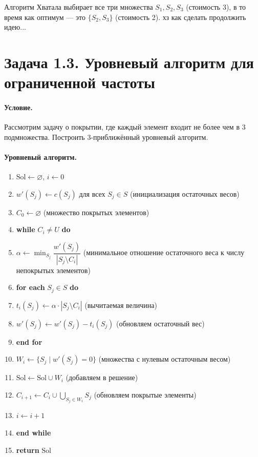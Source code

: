 \documentclass[12pt]{article}
\begin{document}
  Алгоритм Хватала выбирает все три множества \(S_1, S_2, S_3\) (стоимость 3), в то время как оптимум — это \(\{S_2, S_3\}\) (стоимость 2). хз как сделать продолжить идею...
  \section*{Задача 1.3. Уровневый алгоритм для ограниченной частоты}

  \paragraph{Условие.}
  Рассмотрим задачу о покрытии, где каждый элемент входит не более чем в 3 подмножества. Построить 3-приближённый уровневый алгоритм.

  \paragraph{Уровневый алгоритм.}
  \begin{enumerate}
    \item \(\text{Sol} \gets \varnothing\), \(i \gets 0\)
    \item \(w'(S_j) \gets c(S_j)\) для всех \(S_j \in S\) (инициализация остаточных весов)
    \item \(C_0 \gets \varnothing\) (множество покрытых элементов)
    \item \textbf{while} \(C_i \neq U\) \textbf{do}
    \item \quad \(\alpha \gets \min_{S_j} \dfrac{w'(S_j)}{|S_j \setminus C_i|}\) (минимальное отношение остаточного веса к числу непокрытых элементов)
    \item \quad \textbf{for each} \(S_j \in S\) \textbf{do}
    \item \quad\quad \(t_i(S_j) \gets \alpha \cdot |S_j \setminus C_i|\) (вычитаемая величина)
    \item \quad\quad \(w'(S_j) \gets w'(S_j) - t_i(S_j)\) (обновляем остаточный вес)
    \item \quad \textbf{end for}
    \item \quad \(W_i \gets \{S_j \mid w'(S_j) = 0\}\) (множества с нулевым остаточным весом)
    \item \quad \(\text{Sol} \gets \text{Sol} \cup W_i\) (добавляем в решение)
    \item \quad \(C_{i+1} \gets C_i \cup \bigcup_{S_j \in W_i} S_j\) (обновляем покрытые элементы)
    \item \quad \(i \gets i + 1\)
    \item \textbf{end while}
    \item \textbf{return} \(\text{Sol}\)
  \end{enumerate}
\end{document}

